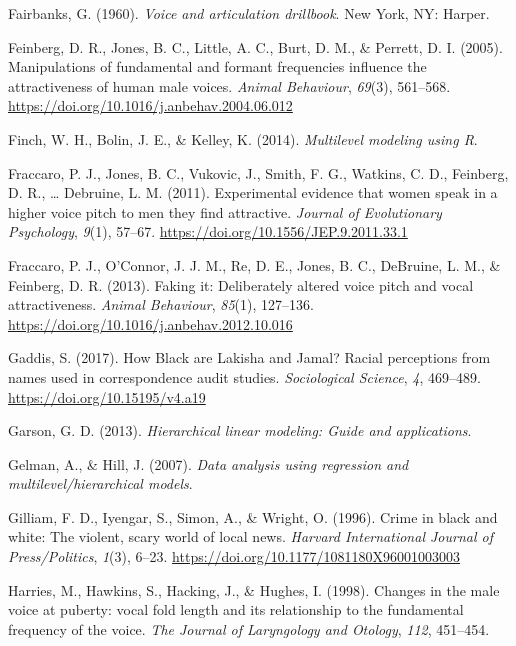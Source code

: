 \documentclass[
  english,
  man]{apa6}
\begin{document}
\leavevmode\hypertarget{ref-Fairbanks1960}{}%
Fairbanks, G. (1960). \emph{Voice and articulation drillbook}. New York, NY: Harper.

\leavevmode\hypertarget{ref-Feinberg2005}{}%
Feinberg, D. R., Jones, B. C., Little, A. C., Burt, D. M., \& Perrett, D. I. (2005). Manipulations of fundamental and formant frequencies influence the attractiveness of human male voices. \emph{Animal Behaviour}, \emph{69}(3), 561--568. \url{https://doi.org/10.1016/j.anbehav.2004.06.012}

\leavevmode\hypertarget{ref-Finch2014}{}%
Finch, W. H., Bolin, J. E., \& Kelley, K. (2014). \emph{Multilevel modeling using R}.

\leavevmode\hypertarget{ref-Fraccaro2011}{}%
Fraccaro, P. J., Jones, B. C., Vukovic, J., Smith, F. G., Watkins, C. D., Feinberg, D. R., \ldots{} Debruine, L. M. (2011). Experimental evidence that women speak in a higher voice pitch to men they find attractive. \emph{Journal of Evolutionary Psychology}, \emph{9}(1), 57--67. \url{https://doi.org/10.1556/JEP.9.2011.33.1}

\leavevmode\hypertarget{ref-Fraccaro2013}{}%
Fraccaro, P. J., O'Connor, J. J. M., Re, D. E., Jones, B. C., DeBruine, L. M., \& Feinberg, D. R. (2013). Faking it: Deliberately altered voice pitch and vocal attractiveness. \emph{Animal Behaviour}, \emph{85}(1), 127--136. \url{https://doi.org/10.1016/j.anbehav.2012.10.016}

\leavevmode\hypertarget{ref-Gaddis2017}{}%
Gaddis, S. (2017). How Black are Lakisha and Jamal? Racial perceptions from names used in correspondence audit studies. \emph{Sociological Science}, \emph{4}, 469--489. \url{https://doi.org/10.15195/v4.a19}

\leavevmode\hypertarget{ref-Garson2013}{}%
Garson, G. D. (2013). \emph{Hierarchical linear modeling: Guide and applications}.

\leavevmode\hypertarget{ref-Gelman2007}{}%
Gelman, A., \& Hill, J. (2007). \emph{Data analysis using regression and multilevel/hierarchical models}.

\leavevmode\hypertarget{ref-Gilliam1996}{}%
Gilliam, F. D., Iyengar, S., Simon, A., \& Wright, O. (1996). Crime in black and white: The violent, scary world of local news. \emph{Harvard International Journal of Press/Politics}, \emph{1}(3), 6--23. \url{https://doi.org/10.1177/1081180X96001003003}

\leavevmode\hypertarget{ref-Harries1998}{}%
Harries, M., Hawkins, S., Hacking, J., \& Hughes, I. (1998). Changes in the male voice at puberty: vocal fold length and its relationship to the fundamental frequency of the voice. \emph{The Journal of Laryngology and Otology}, \emph{112}, 451--454.
\end{document}
